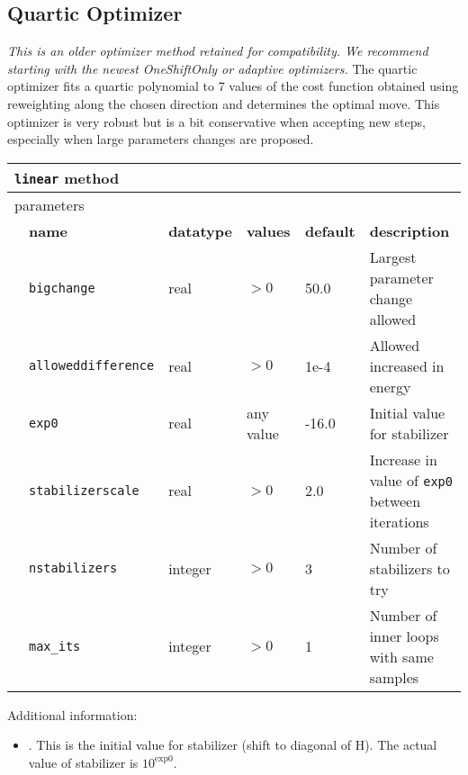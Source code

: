 \subsection{Quartic Optimizer}
\textit{This is an older optimizer method retained for compatibility. We recommend starting with the newest OneShiftOnly or adaptive optimizers.}
The quartic optimizer fits a quartic polynomial to 7 values of the cost function obtained using reweighting along the chosen direction and determines the optimal move.
This optimizer is very robust but is a bit conservative when accepting new steps, especially when large parameters changes are proposed.
\begin{table}[h]
\begin{center}
\begin{tabularx}{\textwidth}{l l l l l X }
\hline
\multicolumn{6}{l}{\texttt{linear} method} \\
\hline
\multicolumn{2}{l}{parameters}  & \multicolumn{4}{l}{}\\
   &   \bfseries name     & \bfseries datatype & \bfseries values & \bfseries default   & \bfseries description \\
   &   \texttt{bigchange} &  real     & $>0$ & 50.0  & Largest parameter change allowed\\
   &   \texttt{alloweddifference} &  real     & $>0$ & 1e-4 & Allowed increased in energy\\
   &   \texttt{exp0} &  real     & any value & -16.0 & Initial value for stabilizer\\
   &   \texttt{stabilizerscale} &  real     & $>0$ & 2.0 & Increase in value of \texttt{exp0} between iterations\\
   &   \texttt{nstabilizers} &  integer     & $>0$ & 3 & Number of stabilizers to try\\
   &   \texttt{max\_its} &  integer   & $>0$ & 1 & Number of inner loops with same samples\\
  \hline
\end{tabularx}
\end{center}
\end{table}

Additional information:
\begin{itemize}
\item {}. This is the initial value for stabilizer (shift to diagonal of H). The actual value of stabilizer is $10^{\textrm{exp0}}$.
\end{itemize}

